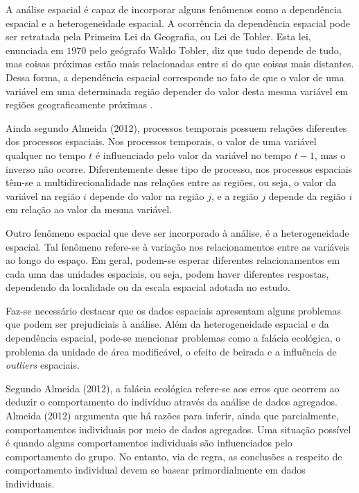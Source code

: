 \documentclass[12pt,a4paper]{article}
\begin{document}
A análise espacial é capaz de incorporar alguns fenômenos como a dependência espacial e a heterogeneidade espacial. A ocorrência da dependência espacial pode ser retratada pela Primeira Lei da Geografia, ou Lei de Tobler. Esta lei, enunciada em $1970$ pelo geógrafo Waldo Tobler, diz que tudo depende de tudo, mas coisas próximas estão mais relacionadas entre si do que coisas mais distantes. Dessa forma, a dependência espacial corresponde no fato de que o valor de uma variável em uma determinada região depender do valor desta mesma variável em regiões geograficamente próximas \cite{almeida12_g}.
	
Ainda segundo Almeida (2012), processos temporais possuem relações diferentes dos processos espaciais. Nos processos temporais, o valor de uma variável qualquer no tempo $t$ é influenciado pelo valor da variável no tempo $t-1$, mas o inverso não ocorre. Diferentemente desse tipo de processo, nos  processos espaciais têm-se a multidirecionalidade nas relações entre as regiões, ou seja, o valor da variável na região $i$ depende do valor na região $j$, e a região $j$ depende da região $i$ em relação ao valor da mesma variável.
	
	
Outro fenômeno espacial que deve ser incorporado à análise, é a heterogeneidade espacial. Tal fenômeno refere-se à variação nos relacionamentos entre as variáveis ao longo do espaço. Em geral, podem-se esperar diferentes relacionamentos em cada uma das unidades espaciais, ou seja, podem haver diferentes respostas, dependendo da localidade ou da escala espacial adotada no estudo. 
	
Faz-se necessário destacar que os dados espaciais apresentam alguns problemas que podem ser prejudiciais à análise. Além da heterogeneidade espacial e da dependência espacial, pode-se mencionar problemas como a falácia ecológica, o problema da unidade de área modificável, o efeito de beirada e a influência de \textit{outliers} espaciais. 
	
Segundo Almeida (2012), a falácia ecológica refere-se aos erros que ocorrem ao deduzir o comportamento do indivíduo através da análise de dados agregados. Almeida (2012) argumenta que há razões para inferir, ainda que parcialmente, comportamentos individuais por meio de dados agregados. Uma situação possível é quando alguns comportamentos individuais são influenciados pelo comportamento do grupo. No entanto, via de regra, as conclusões a respeito de comportamento individual devem se basear primordialmente em dados individuais. 
\end{document}
